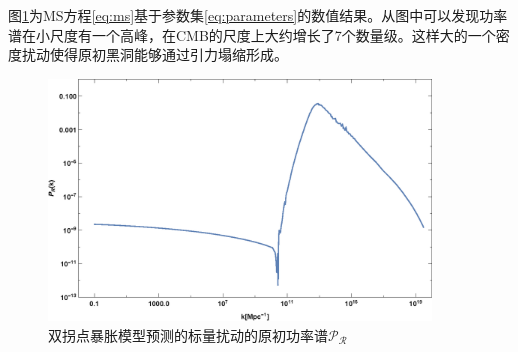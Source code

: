 图\ref{fig:pert}为MS方程\ref{eq:ms}基于参数集\ref{eq:parameters}的数值结果。从图中可以发现功率谱在小尺度有一个高峰，在CMB的尺度上大约增长了7个数量级。这样大的一个密度扰动使得原初黑洞能够通过引力塌缩形成。

\begin{figure}[!htbp]
    \centering
    \includegraphics[width=4in]{Img/pert.eps}
    \caption{双拐点暴胀模型预测的标量扰动的原初功率谱$\mathcal{P_R}$}\label{fig:pert}
\end{figure}
